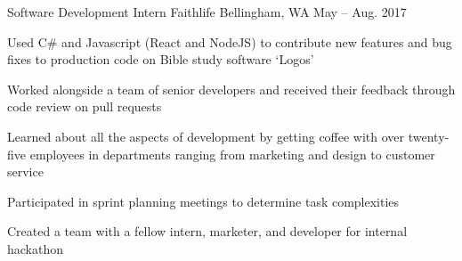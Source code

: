 

\begin{cventries}

  \cventry
    {Software Development Intern} %
    {Faithlife} %
    {Bellingham, WA} %
    {May – Aug. 2017} %
    {
      \begin{cvitems} %
        \item {Used C\# and Javascript (React and NodeJS) to contribute new features and bug fixes to production code on Bible study software `Logos'}
        \item {Worked alongside a team of senior developers and received their feedback through code review on pull requests}
        \item {Learned about all the aspects of development by getting coffee with over twenty-five employees in departments ranging from marketing and design to customer service}
        \item {Participated in sprint planning meetings to determine task complexities}
        \item {Created a team with a fellow intern, marketer, and developer for internal hackathon}
      \end{cvitems}
    }

\end{cventries}
